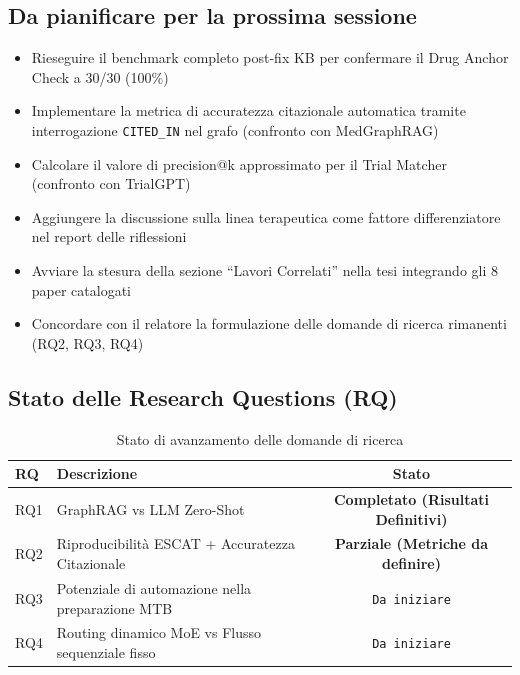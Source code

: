 \documentclass[12pt, a4paper]{article}
\newcommand{\pass}[1]{{\color{passgreen}\textbf{#1}}}
\newcommand{\warn}[1]{{\color{warnAmber}\textbf{#1}}}
\begin{document}
\subsection*{Da pianificare per la prossima sessione}
\begin{itemize}[leftmargin=1.8em, itemsep=2pt, label={[\textsf{\phantom{x}}]}]
  \item Rieseguire il benchmark completo post-fix KB per confermare il Drug Anchor Check a 30/30 (100\%)
  \item Implementare la metrica di accuratezza citazionale automatica tramite interrogazione \texttt{CITED\_IN} nel grafo (confronto con MedGraphRAG)
  \item Calcolare il valore di precision@k approssimato per il Trial Matcher (confronto con TrialGPT)
  \item Aggiungere la discussione sulla linea terapeutica come fattore differenziatore nel report delle riflessioni
  \item Avviare la stesura della sezione ``Lavori Correlati'' nella tesi integrando gli 8 paper catalogati
  \item Concordare con il relatore la formulazione delle domande di ricerca rimanenti (RQ2, RQ3, RQ4)
\end{itemize}

\subsection*{Stato delle Research Questions (RQ)}
\begin{table}[htbp]
\centering
\small
\renewcommand{\arraystretch}{1.3}
\caption{Stato di avanzamento delle domande di ricerca}
\begin{tabularx}{\textwidth}{l X c}
\toprule
\rowcolor{primaryblue}
\color{white}\textbf{RQ} & \color{white}\textbf{Descrizione} & \color{white}\textbf{Stato} \\
\midrule
RQ1 & GraphRAG vs LLM Zero-Shot & \pass{Completato (Risultati Definitivi)} \\
\rowcolor{roweven}
RQ2 & Riproducibilità ESCAT + Accuratezza Citazionale & \warn{Parziale (Metriche da definire)} \\
RQ3 & Potenziale di automazione nella preparazione MTB & \texttt{Da iniziare} \\
\rowcolor{roweven}
RQ4 & Routing dinamico MoE vs Flusso sequenziale fisso & \texttt{Da iniziare} \\
\bottomrule
\end{tabularx}
\end{table}
\end{document}
